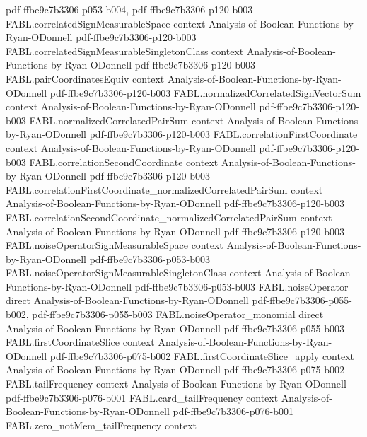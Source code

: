 \begin{theorem}
  {pdf-ffbe9c7b3306-p053-b004,
    pdf-ffbe9c7b3306-p120-b003}
\proofstep
  {FABL.correlatedSignMeasurableSpace}
  {context}
  {Analysis-of-Boolean-Functions-by-Ryan-ODonnell}
  {pdf-ffbe9c7b3306-p120-b003}
\proofstep
  {FABL.correlatedSignMeasurableSingletonClass}
  {context}
  {Analysis-of-Boolean-Functions-by-Ryan-ODonnell}
  {pdf-ffbe9c7b3306-p120-b003}
\proofstep
  {FABL.pairCoordinatesEquiv}
  {context}
  {Analysis-of-Boolean-Functions-by-Ryan-ODonnell}
  {pdf-ffbe9c7b3306-p120-b003}
\proofstep
  {FABL.normalizedCorrelatedSignVectorSum}
  {context}
  {Analysis-of-Boolean-Functions-by-Ryan-ODonnell}
  {pdf-ffbe9c7b3306-p120-b003}
\proofstep
  {FABL.normalizedCorrelatedPairSum}
  {context}
  {Analysis-of-Boolean-Functions-by-Ryan-ODonnell}
  {pdf-ffbe9c7b3306-p120-b003}
\proofstep
  {FABL.correlationFirstCoordinate}
  {context}
  {Analysis-of-Boolean-Functions-by-Ryan-ODonnell}
  {pdf-ffbe9c7b3306-p120-b003}
\proofstep
  {FABL.correlationSecondCoordinate}
  {context}
  {Analysis-of-Boolean-Functions-by-Ryan-ODonnell}
  {pdf-ffbe9c7b3306-p120-b003}
\proofstep
  {FABL.correlationFirstCoordinate_normalizedCorrelatedPairSum}
  {context}
  {Analysis-of-Boolean-Functions-by-Ryan-ODonnell}
  {pdf-ffbe9c7b3306-p120-b003}
\proofstep
  {FABL.correlationSecondCoordinate_normalizedCorrelatedPairSum}
  {context}
  {Analysis-of-Boolean-Functions-by-Ryan-ODonnell}
  {pdf-ffbe9c7b3306-p120-b003}
\proofstep
  {FABL.noiseOperatorSignMeasurableSpace}
  {context}
  {Analysis-of-Boolean-Functions-by-Ryan-ODonnell}
  {pdf-ffbe9c7b3306-p053-b003}
\proofstep
  {FABL.noiseOperatorSignMeasurableSingletonClass}
  {context}
  {Analysis-of-Boolean-Functions-by-Ryan-ODonnell}
  {pdf-ffbe9c7b3306-p053-b003}
\proofstep
  {FABL.noiseOperator}
  {direct}
  {Analysis-of-Boolean-Functions-by-Ryan-ODonnell}
  {pdf-ffbe9c7b3306-p055-b002,
    pdf-ffbe9c7b3306-p055-b003}
\proofstep
  {FABL.noiseOperator_monomial}
  {direct}
  {Analysis-of-Boolean-Functions-by-Ryan-ODonnell}
  {pdf-ffbe9c7b3306-p055-b003}
\proofstep
  {FABL.firstCoordinateSlice}
  {context}
  {Analysis-of-Boolean-Functions-by-Ryan-ODonnell}
  {pdf-ffbe9c7b3306-p075-b002}
\proofstep
  {FABL.firstCoordinateSlice_apply}
  {context}
  {Analysis-of-Boolean-Functions-by-Ryan-ODonnell}
  {pdf-ffbe9c7b3306-p075-b002}
\proofstep
  {FABL.tailFrequency}
  {context}
  {Analysis-of-Boolean-Functions-by-Ryan-ODonnell}
  {pdf-ffbe9c7b3306-p076-b001}
\proofstep
  {FABL.card_tailFrequency}
  {context}
  {Analysis-of-Boolean-Functions-by-Ryan-ODonnell}
  {pdf-ffbe9c7b3306-p076-b001}
\proofstep
  {FABL.zero_notMem_tailFrequency}
  {context}

\end{theorem}
